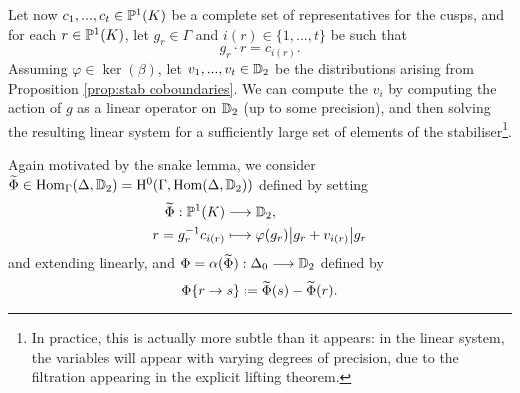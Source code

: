 \documentclass[a4paper,11pt]{article}
\numberwithin{equation}{section}
\begin{document}
Let now $c_1, ..., c_t \in \mathbb{P}^1(K)$ be a complete set of representatives for the cusps, and for each $r \in \mathbb{P}^1(K)$, let $g_r \in \Gamma$ and $i(r) \in \{1,...,t\}$ be such that
\[
	g_r \cdot r = c_{i(r)}. 
\]
Assuming $\varphi \in \ker(\beta)$, let $v_1, ..., v_t \in \mathbb{D}_2$ be the distributions arising from Proposition \ref{prop:stab coboundaries}. We can compute the $v_i$ by computing the action of $g$ as a linear operator on $\mathbb{D}_2$ (up to some precision), and then solving the resulting linear system for a sufficiently large set of elements of the stabiliser\footnote{In practice, this is actually more subtle than it appears: in the linear system, the variables will appear with varying degrees of precision, due to the filtration appearing in the explicit lifting theorem.}.
	
Again motivated by the snake lemma, we consider $\widetilde{\Phi} \in \mathrm{Hom}_\Gamma(\Delta,\mathbb{D}_2) = \mathrm{H}^0(\Gamma,\mathrm{Hom}(\Delta,\mathbb{D}_2))$ defined by setting
	\begin{align*}
		\widetilde{\Phi} : \mathbb{P}^1(K) &\longrightarrow \mathbb{D}_2,\\
				r = g_r^{-1}c_{i(r)} &\longmapsto \varphi(g_r)\big|g_r + v_{i(r)}\big|g_r
	\end{align*}
	and extending linearly, and $\Phi = \alpha(\widetilde{\Phi}) : \Delta_0 \longrightarrow \mathbb{D}_2$ defined by
	\[
		\Phi\{r\to s\} \defeq \widetilde{\Phi}(s) - \widetilde{\Phi}(r).
	\]



	
\end{document}
